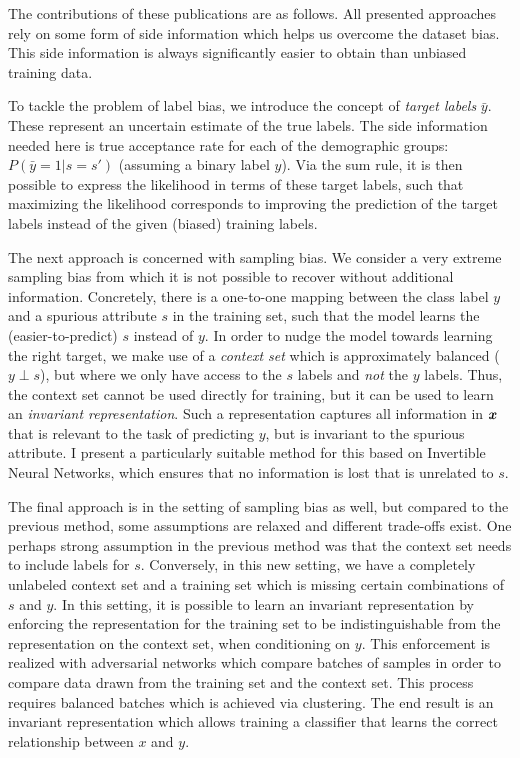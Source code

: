The contributions of these publications are as follows.
All presented approaches rely on some form of side information which helps us overcome the dataset bias.
This side information is always significantly easier to obtain than unbiased training data.

To tackle the problem of label bias, we introduce the concept of \emph{target labels} $\bar{y}$.
These represent an uncertain estimate of the true labels.
The side information needed here is true acceptance rate for each of the demographic groups: $P(\bar{y}=1|s=s')$
(assuming a binary label $y$).
Via the sum rule, it is then possible to express the likelihood in terms of these target labels,
such that maximizing the likelihood corresponds to improving the prediction of the target labels
instead of the given (biased) training labels.

The next approach is concerned with sampling bias.
We consider a very extreme sampling bias from which it is not possible to recover without additional information.
Concretely, there is a one-to-one mapping between the class label $y$ and a spurious attribute $s$ in the training set,
such that the model learns the (easier-to-predict) $s$ instead of $y$.
In order to nudge the model towards learning the right target,
we make use of a \emph{context set} which is approximately balanced ($y\perp s$),
but where we only have access to the $s$ labels and \emph{not} the $y$ labels.
Thus, the context set cannot be used directly for training, but it can be used to learn an \emph{invariant representation}.
Such a representation captures all information in ${\bm{x}}$ that is relevant to the task of predicting $y$,
but is invariant to the spurious attribute.
I present a particularly suitable method for this based on Invertible Neural Networks,
which ensures that no information is lost that is unrelated to $s$.

The final approach is in the setting of sampling bias as well,
but compared to the previous method, some assumptions are relaxed and different trade-offs exist.
One perhaps strong assumption in the previous method was
that the context set needs to include labels for $s$.
Conversely, in this new setting, we have a completely unlabeled context set
and a training set which is missing certain combinations of $s$ and $y$.
In this setting, it is possible to learn an invariant representation
by enforcing the representation for the training set to be indistinguishable from the representation on the context set,
when conditioning on $y$.
This enforcement is realized with adversarial networks which compare batches of samples
in order to compare data drawn from the training set and the context set.
This process requires balanced batches which is achieved via clustering.
The end result is an invariant representation which allows training a classifier
that learns the correct relationship between $x$ and $y$.

